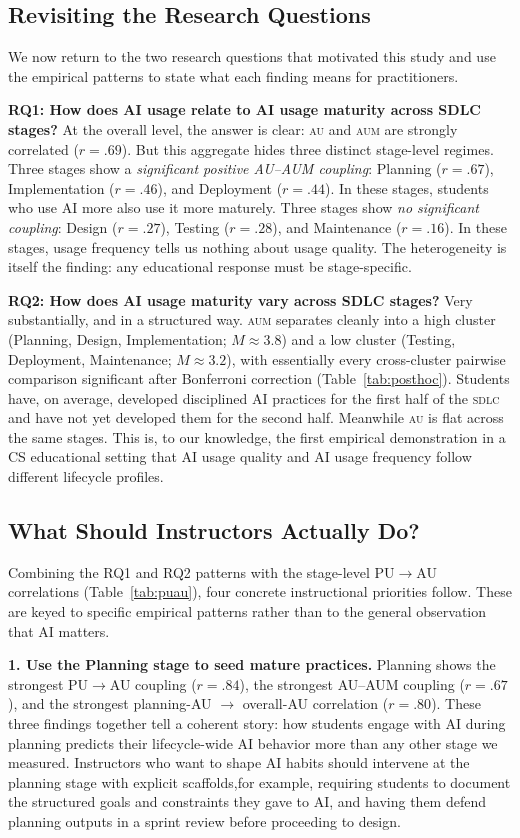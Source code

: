 \documentclass[sigconf,anonymous]{acmart}
\newcommand{\AUM}{\textsc{aum}\xspace}
\newcommand{\AU}{\textsc{au}\xspace}
\newcommand{\SDLC}{\textsc{sdlc}\xspace}
\begin{document}
\subsection{Revisiting the Research Questions}
We now return to the two research questions that motivated this study
and use the empirical patterns to state what each finding means for
practitioners.

\textbf{RQ1: How does AI usage relate to AI usage maturity across SDLC
stages?} At the overall level, the answer is clear: \AU and \AUM are
strongly correlated ($r = .69$). But this aggregate hides three
distinct stage-level regimes. Three stages show a \emph{significant
positive AU--AUM coupling}: Planning ($r = .67$), Implementation
($r = .46$), and Deployment ($r = .44$). In these stages, students who
use AI more also use it more maturely. Three stages show \emph{no
significant coupling}: Design ($r = .27$), Testing ($r = .28$), and
Maintenance ($r = .16$). In these stages, usage frequency tells us
nothing about usage quality. The heterogeneity is itself the finding:
any educational response must be stage-specific.

\textbf{RQ2: How does AI usage maturity vary across SDLC stages?}
Very substantially, and in a structured way. \AUM separates cleanly
into a high cluster (Planning, Design, Implementation; $M \approx 3.8$)
and a low cluster (Testing, Deployment, Maintenance;
$M \approx 3.2$), with essentially every cross-cluster pairwise
comparison significant after Bonferroni correction
(Table~\ref{tab:posthoc}). Students have, on average, developed
disciplined AI practices for the first half of the \SDLC and have not
yet developed them for the second half. Meanwhile \AU is flat across
the same stages. This is, to our knowledge, the first empirical
demonstration in a CS educational setting that AI usage quality and
AI usage frequency follow different lifecycle profiles.

\subsection{What Should Instructors Actually Do?}
Combining the RQ1 and RQ2 patterns with the stage-level PU$\rightarrow$AU
correlations (Table~\ref{tab:puau}), four concrete instructional
priorities follow. These are keyed to specific empirical patterns
rather than to the general observation that AI matters.

\textbf{1. Use the Planning stage to seed mature practices.} Planning
shows the strongest PU$\rightarrow$AU coupling ($r = .84$), the
strongest AU--AUM coupling ($r = .67$), and the strongest planning-AU
$\rightarrow$ overall-AU correlation ($r = .80$). These three
findings together tell a coherent story: how students engage with AI
during planning predicts their lifecycle-wide AI behavior more than
any other stage we measured. Instructors who want to shape AI habits
should intervene at the planning stage with explicit scaffolds,for
example, requiring students to document the structured goals and
constraints they gave to AI, and having them defend planning outputs
in a sprint review before proceeding to design.
\end{document}

